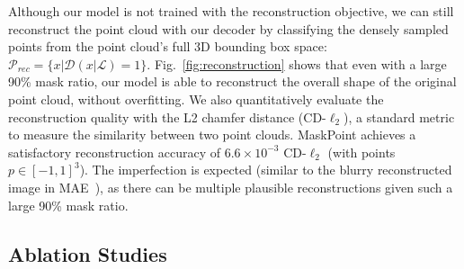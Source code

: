 \documentclass[runningheads]{llncs}
\begin{document}
Although our model is not trained with the reconstruction objective, we can still reconstruct the point cloud with our decoder by classifying the densely sampled points from the point cloud's full 3D bounding box space: $\mathcal{P}_{rec} = \{x|\mathcal{D}(x|\mathcal{L})=1\}$.
Fig.~\ref{fig:reconstruction} shows that even with a large 90\% mask ratio, our model is able to reconstruct the overall shape of the original point cloud, without overfitting.
We also quantitatively evaluate the reconstruction quality with the L2 chamfer distance (CD-$\ell_2$), a standard metric to measure the similarity between two point clouds.  MaskPoint achieves a satisfactory reconstruction accuracy of $6.6\times10^{-3}$ CD-$\ell_2$ (with points $p \in [-1, 1]^3$).
The imperfection is expected (similar to the blurry reconstructed image in MAE~\cite{mae}), as there can be multiple plausible reconstructions given such a large 90\% mask ratio.

\subsection{Ablation Studies}
\end{document}
